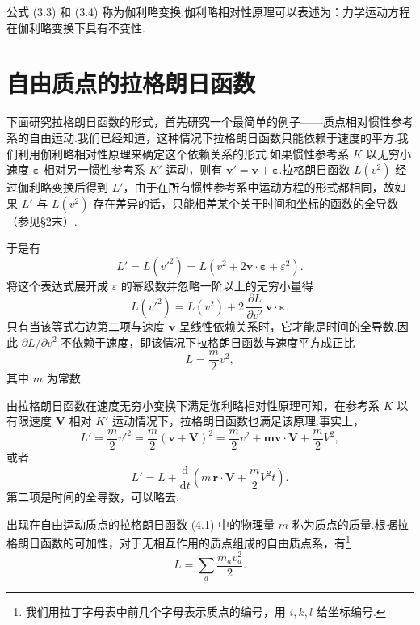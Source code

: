 公式 (3.3) 和 (3.4) 称为伽利略变换.伽利略相对性原理可以表述为：力学运动方程在伽利略变换下具有不变性.

\section{自由质点的拉格朗日函数}

下面研究拉格朗日函数的形式，首先研究一个最简单的例子——质点相对惯性参考系的自由运动.我们已经知道，这种情况下拉格朗日函数只能依赖于速度的平方.我们利用伽利略相对性原理来确定这个依赖关系的形式.如果惯性参考系 $K$ 以无穷小速度 $\boldsymbol{\varepsilon}$ 相对另一惯性参考系 $K'$ 运动，则有 $\boldsymbol{v}'=\boldsymbol{v}+\boldsymbol{\varepsilon}$.拉格朗日函数 $L(v^2)$ 经过伽利略变换后得到 $L'$，由于在所有惯性参考系中运动方程的形式都相同，故如果 $L'$ 与 $L(v^2)$ 存在差异的话，只能相差某个关于时间和坐标的函数的全导数（参见§2末）.

于是有
\begin{equation*}
  L'=L(v'^2)=L\left(v^2+2\boldsymbol{v}\cdot\boldsymbol{\varepsilon}
  +\varepsilon^2\right).
\end{equation*}
将这个表达式展开成 $\varepsilon$ 的幂级数并忽略一阶以上的无穷小量得
\begin{equation*}
  L(v'^2)=L(v^2)+2\,\frac{\partial L}{\partial v^2}\,
  \boldsymbol{v}\cdot\boldsymbol{\varepsilon}.
\end{equation*}
只有当该等式右边第二项与速度 $\boldsymbol{v}$ 呈线性依赖关系时，它才能是时间的全导数.因此 $\partial L/\partial v^2$ 不依赖于速度，即该情况下拉格朗日函数与速度平方成正比
\begin{equation}
  L=\frac{m}{2}v^2,
\end{equation}
其中 $m$ 为常数.

由拉格朗日函数在速度无穷小变换下满足伽利略相对性原理可知，在参考系 $K$ 以有限速度 $\boldsymbol{V}$ 相对 $K'$ 运动情况下，拉格朗日函数也满足该原理.事实上，
\begin{equation*}
  L'=\frac{m}{2}v'^2=\frac{m}{2}(\boldsymbol{v}+\boldsymbol{V})^2
  =\frac{m}{2}v^2+\boldsymbol{m}\boldsymbol{v}\cdot\boldsymbol{V}
  +\frac{m}{2}V^2,
\end{equation*}
或者
\begin{equation*}
  L'=L+\frac{\mathrm{d}}{\mathrm{d}t}\left(m\,\boldsymbol{r}\cdot\boldsymbol{V}
  +\frac{m}{2}V^2t\right).
\end{equation*}
第二项是时间的全导数，可以略去.

出现在自由运动质点的拉格朗日函数 (4.1) 中的物理量 $m$ 称为质点的质量.根据拉格朗日函数的可加性，对于无相互作用的质点组成的自由质点系，有\footnote{我们用拉丁字母表中前几个字母表示质点的编号，用 $i,k,l$ 给坐标编号.}
\begin{equation}
  L=\sum_a\frac{m_a v_a^2}{2}.
\end{equation}

